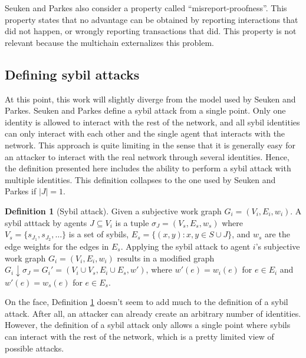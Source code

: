 \documentclass[a4paper,11pt]{book}
\theoremstyle{definition}
\newtheorem{definition}{Definition}
\begin{document}
Seuken and Parkes also consider a property called ``misreport-proofness''. This property
states that no advantage can be obtained by reporting interactions that did not happen,
or wrongly reporting transactions that did. This property is not relevant because
the multichain externalizes this problem. 

\subsection{Defining sybil attacks}

At this point, this work will slightly diverge from the model used by Seuken and Parkes. 
Seuken and Parkes define a sybil attack from a single point. Only one identity is allowed
to interact with the rest of the network, and all sybil identities can only interact with
each other and the single agent that interacts with the network. This approach is quite
limiting in the sense that it is generally easy for an attacker to interact with the 
real network through several identities. Hence, the definition presented here
includes the ability to perform a sybil attack with multiple identities. This definition
collapses to the one used by Seuken and Parkes if $|J|=1$.

\begin{definition}[Sybil attack]
    Given a subjective work graph $G_i = (V_i, E_i, w_i)$.
    A sybil atttack by agents $J \subseteq V_i$ is a tuple $\sigma_J = (V_s, E_s, w_s)$
    where $V_s = \{ s_{J_1}, s_{J_2}, \ldots\}$ is a set of sybils, 
    $E_s = \{(x, y) : x, y \in S \cup J\}$, and $w_s$ are the edge weights for
    the edges in $E_s$. Applying the sybil attack to agent $i$'s subjective work graph
    $G_i = (V_i, E_i, w_i)$ results in a modified graph 
    $G_i \downarrow \sigma_J = G_i' = (V_i \cup V_s, E_i \cup E_s, w')$, where
    $w'(e) = w_i(e)$ for $e \in E_i$ and $w'(e) = w_s(e)$ for $e \in E_s$.
    \label{def:collsybil}
\end{definition}

On the face, Definition \ref{def:collsybil} doesn't seem to add much to the definition of a sybil attack.
After all, an attacker can already create an arbitrary number of identities. However, the definition of a
sybil attack only allows a single point where sybils can interact with the rest of the network, which is a pretty limited
view of possible attacks. 
\end{document}

